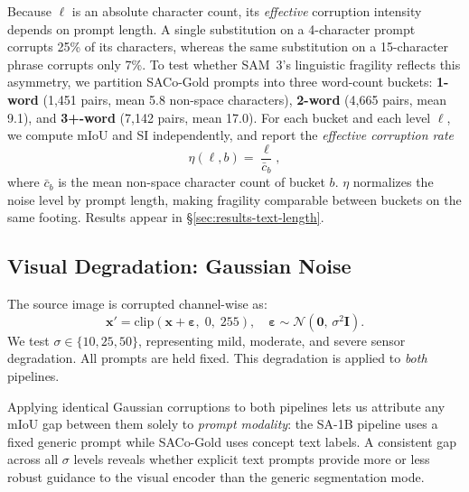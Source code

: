 \documentclass[10pt,twocolumn,letterpaper]{article}
\begin{document}
Because $\ell$ is an absolute character count, its \emph{effective} corruption intensity depends on prompt length.  A single substitution on a 4-character prompt corrupts 25\% of its characters, whereas the
same substitution on a 15-character phrase corrupts only 7\%.  To test whether SAM~3's linguistic fragility reflects this asymmetry, we partition SACo-Gold prompts into three word-count buckets: \textbf{1-word} (1{,}451 pairs, mean
5.8 non-space characters), \textbf{2-word} (4{,}665 pairs, mean 9.1), and
\textbf{3\kern0pt+\kern0pt-word} (7{,}142 pairs, mean 17.0).  For each bucket
and each level $\ell$, we compute mIoU and SI independently, and report the
\emph{effective corruption rate}
%
\begin{equation}
  \eta(\ell, b) = \frac{\ell}{\bar{c}_b},
  \label{eq:eff-corruption}
\end{equation}
%
where $\bar{c}_b$ is the mean non-space character count of bucket $b$.
$\eta$ normalizes the noise level by prompt length, making fragility
comparable between buckets on the same footing.  Results appear in
\S\ref{sec:results-text-length}.
\subsection{Visual Degradation: Gaussian Noise}
The source image is corrupted channel-wise as:
%
\begin{equation}
  \mathbf{x}' = \mathrm{clip}(\mathbf{x} + \boldsymbol{\varepsilon},\;0,\;255),
  \quad
  \boldsymbol{\varepsilon} \sim \mathcal{N}(\mathbf{0},\,\sigma^2\mathbf{I}).
  \label{eq:awgn}
\end{equation}
%
We test $\sigma \in \{10, 25, 50\}$, representing mild, moderate, and severe
sensor degradation.  All prompts are held fixed.  This degradation is applied to \emph{both} pipelines.



Applying identical Gaussian corruptions to both pipelines lets us attribute any mIoU gap between them solely to \emph{prompt modality}: the SA-1B pipeline uses a fixed generic prompt while SACo-Gold uses concept text labels. A consistent
gap across all $\sigma$ levels reveals whether explicit text prompts provide more or less robust guidance to the visual encoder than the generic segmentation mode.
\end{document}
